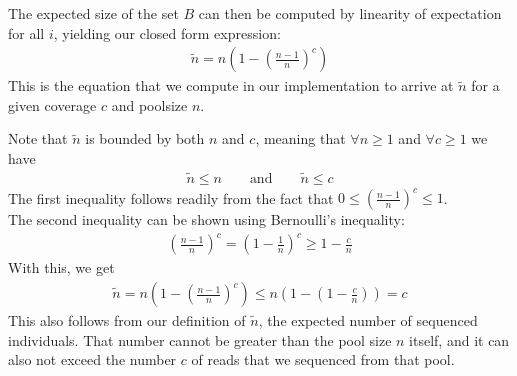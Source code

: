 \documentclass[letterpaper,fontsize=9pt,DIV=12]{scrartcl}
\newcounter{todo}
\newcommand\todo[1]{}
\newcommand{\coverage}{c}
\begin{document}
The expected size of the set $B$ can then be computed by linearity of expectation for all $i$,
yielding our closed form expression:
%
%
\begin{align}
    \label{eq:NTildeClosedForm}
    \tilde{n} = n \left( 1 - \left( \frac{n-1}{n} \right)^\coverage \right)
\end{align}
%
This is the equation that we compute in our implementation to arrive at $\tilde{n}$ for a given coverage $\coverage$ and poolsize $n$.

Note that $\tilde{n}$ is bounded by both $n$ and $c$, meaning that $\forall n \geq 1$ and $\forall c \geq 1$ we have
\begin{align}
    \label{eq:NTildeBounds}
     \tilde{n} \leq n \qquad\mbox{and}\qquad \tilde{n} \leq c
\end{align}
The first inequality follows readily from the fact that $0 \le (\frac{n-1}{n})^c \le 1$. \\
The second inequality can be shown using Bernoulli's inequality:
\begin{align}
     \left( \frac{n-1}{n} \right)^c = \left(1 - \frac{1}{n} \right)^c \geq 1 - \frac{c}{n}
\end{align}
With this, we get
\begin{align}
    \tilde{n} = n \left( 1 - \left( \frac{n-1}{n} \right)^\coverage \right) \leq n \left( 1 - \left( 1 - \frac{c}{n} \right) \right) = c
\end{align}
This also follows from our definition of $\tilde{n}$, the expected number of sequenced individuals. That number cannot be greater than the pool size $n$ itself, and it can also not exceed the number $c$ of reads that we sequenced from that pool.


\todo{UNRESOLVED ISSUE: This is computed using the coverage $\coverage$ in the above equations (and in the PoPoolation equations), but seems to be called with $b$ (min coverage) in their code (and in mine). Jeff, is that yet another bug (number three then, on top of the two already mentioned two sections below) that they introduced in their code? it seems weird to compute this based on the min coverage, than the actual coverage at the site.  JPS: I'm actually not totally sure what the PoPoolation people are doing here.  I guess they're plugging an estimate of $n$ into the f alpha and beta, which is fine, but could be biased.  My guess is that you would want to use $\coverage$ and not $b$, but as I said I'm not totally sure what they're doing here. Update 1/4/23 -- I think that they should be using $c$ here and not $b$. But, I should say that just plugging in an estimate for $n$ in the Achaz equations will result in some bias as equations 20, 21, and 22 are nonlinear in n.}
\end{document}
